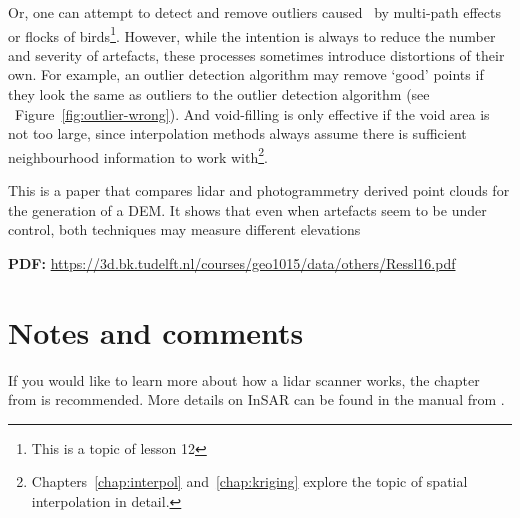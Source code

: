 Or, one can attempt to detect and remove outliers caused \eg\ by multi-path effects or flocks of birds\footnote{This is a topic of lesson 12}. 
However, while the intention is always to reduce the number and severity of artefacts, these processes sometimes introduce distortions of their own.
For example, an outlier detection algorithm may remove `good' points if they look the same as outliers to the outlier detection algorithm (see \eg\ Figure~\ref{fig:outlier-wrong}).
And void-filling is only effective if the void area is not too large, since interpolation methods always assume there is sufficient neighbourhood information to work with\footnote{Chapters~\ref{chap:interpol} and~\ref{chap:kriging} explore the topic of spatial interpolation in detail.}.


\begin{kaobox}[frametitle=\faExternalLink\ To read or to watch.]
This is a paper that compares lidar and photogrammetry derived point clouds for the generation of a DEM\@. It shows that even when artefacts seem to be under control, both techniques may measure different elevations 

\textbf{PDF:} \url{https://3d.bk.tudelft.nl/courses/geo1015/data/others/Ressl16.pdf}
\end{kaobox}







%
\section{Notes and comments}
If you would like to learn more about how a lidar scanner works, the chapter from \citet{Chazette16} is recommended.
More details on InSAR can be found in the manual from \citet{ESA07}.

